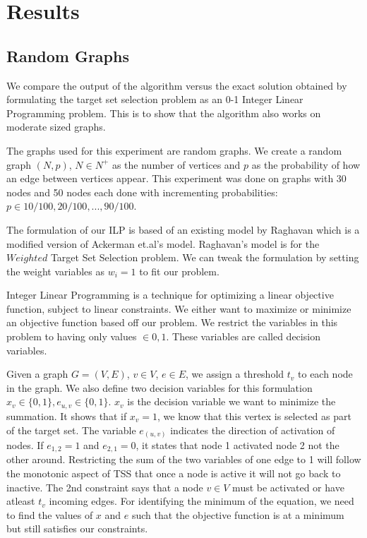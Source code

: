 \clearpage
\section{Results}
\subsection{Random Graphs}

We compare the output of the algorithm versus the exact solution obtained by formulating the target set selection problem as an 0-1 Integer Linear Programming problem. This is to show that the algorithm also works on moderate sized graphs. 

The graphs used for this experiment are random graphs. We create a random graph $(N,p)$, $N \in N^{+}$ as the number of vertices and $p$ as the probability of how an edge between vertices appear. This experiment was done on graphs with 30 nodes and 50 nodes each done with incrementing probabilities: $p\in{10/100,20/100,...,90/100}$.

The formulation of our ILP is based of an existing model by Raghavan\cite{wtss} which is a modified version of Ackerman et.al's model\cite{combi}. Raghavan's model is for the $Weighted$ Target Set Selection problem. We can tweak the formulation by setting the weight variables as $w_{i}=1$ to fit our problem.

Integer Linear Programming is a technique for optimizing a linear objective function, subject to linear constraints. We either want to maximize or minimize an objective function based off our problem. We restrict the variables in this problem to having only values $\in {0,1}$. These variables are called decision variables.

Given a graph $G=(V,E)$, $v \in V$, $e \in E$, we assign a threshold $t_{v}$ to each node in the graph. We also define two decision variables for this formulation $x_{v}\in\{0,1\}, e_{u,v}\in\{0,1\}$. $x_{v}$ is the decision variable we want to minimize the summation. It shows that if $x_{v}=1$, we know that this vertex is selected as part of the target set. The variable $e_{(u,v)}$ indicates the direction of activation of nodes. If $e_{1,2}=1$ and $e_{2,1}=0$, it states that node 1 activated node 2 not the other around. Restricting the sum of the two variables of one edge to 1 will follow the monotonic aspect of TSS that once a node is active it will not go back to inactive\cite{wtss}. The 2nd constraint says that a node $v\in V$ must be activated or have atleast $t_{v}$ incoming edges. For identifying the minimum of the equation, we need to find the values of $x$ and $e$ such that the objective function is at a minimum but still satisfies our constraints.

